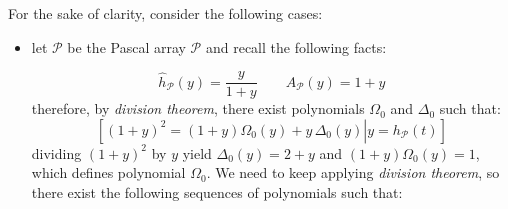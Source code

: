 For the sake of clarity, consider the following cases:
\begin{itemize}

    \item let $\mathcal{P}$ be the Pascal array $\mathcal{P}$ and recall 
        the following facts:
        
        \begin{displaymath} 
            \hat{h}_{\mathcal{P}}(y)=\frac{y}{1+y} \quad\quad A_{\mathcal{P}}(y)=1+y
        \end{displaymath} 
        therefore, by \emph{division theorem}, 
        there exist polynomials $\Omega_{0}$ and $\Delta_{0}$ such that:
        \begin{displaymath}
            \left.\left[
                (1+y)^2 =  (1+y)\Omega_{0}(y) + y\,\Delta_{0}(y) \right| y = h_{\mathcal{P}}(t) \right]
        \end{displaymath}
        dividing $(1+y)^2$ by $y$ yield $\Delta_{0}(y)=2+y$ and $(1+y)\Omega_{0}(y)=1$, 
        which defines polynomial $\Omega_{0}$. We need to 
        keep applying \emph{division theorem}, so there exist the following
        sequences of polynomials such that:


\end{itemize}
